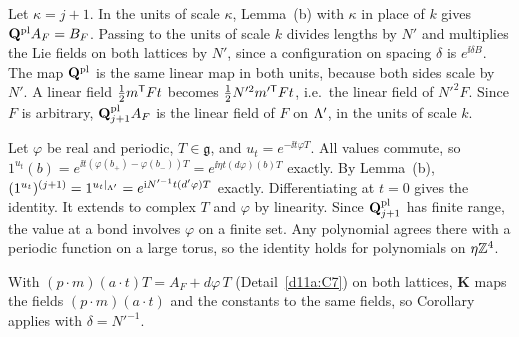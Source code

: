 \begin{detail}\label{d11a:D4}
\begin{step}
Let $\kappa=j+1$. In the units of scale $\kappa$, Lemma~(b) with $\kappa$ in place of $k$ gives $\mathbf Q^{\rm pl}A_F=B_F$. Passing to the units of scale $k$ divides lengths by $N'$ and multiplies the Lie fields on both lattices by $N'$, since a configuration on spacing $\delta$ is $e^{\ii\delta B}$. The map $\mathbf Q^{\rm pl}$ is the same linear map in both units, because both sides scale by $N'$. A linear field $\frac12m^{\sf T}Ft$ becomes $\frac12N'^2m'^{\sf T}Ft$, i.e.\ the linear field of $N'^2F$. Since $F$ is arbitrary, $\mathbf Q^{\rm pl}_{j+1}A_F$ is the linear field of $F$ on $\Lambda'$, in the units of scale $k$.
\end{step}
\begin{step}[\emph{New argument}: $\bQ^{\rm pl}_{j+1}(d\varphi\,T)=(d'\varphi)T$; ``by the gauge covariance in its proof'']
Let $\varphi$ be real and periodic, $T\in\mathfrak g$, and $u_t=e^{-\ii t\varphi T}$. All values commute, so $1^{u_t}(b)=e^{\ii t(\varphi(b_+)-\varphi(b_-))T}=e^{\ii\eta t(d\varphi)(b)T}$ exactly. By Lemma~(b), $(1^{u_t})^{(j+1)}=1^{u_t|_{\Lambda'}}=e^{\mathrm i N'^{-1}t(d'\varphi)T}$ exactly. Differentiating at $t=0$ gives the identity. It extends to complex $T$ and $\varphi$ by linearity. Since $\mathbf Q^{\rm pl}_{j+1}$ has finite range, the value at a bond involves $\varphi$ on a finite set. Any polynomial agrees there with a periodic function on a large torus, so the identity holds for polynomials on $\eta\mathbb Z^4$.
\end{step}
\begin{step}[Conclusion]
With $(p\cdot m)(a\cdot t)T=A_F+d\varphi\,T$ (Detail~\ref{d11a:C7}) on both lattices, $\mathbf K$ maps the fields $(p\cdot m)(a\cdot t)$ and the constants to the same fields, so Corollary~ applies with $\delta=N'^{-1}$.
\end{step}
\end{detail}

